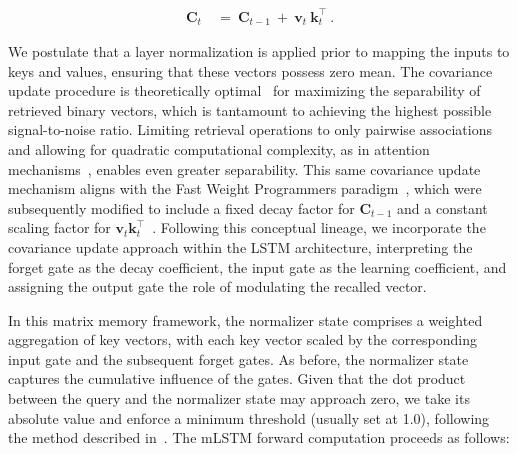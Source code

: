 \begin{align}
\mathbf{C}_t \ &= \ \mathbf{C}_{t-1} \ + \ \mathbf{v}_{t} \ \mathbf{k}_t^\top \ .
\end{align}

We postulate that a layer normalization is applied prior to mapping the inputs to keys and values, ensuring that these vectors possess zero mean. The covariance update procedure is theoretically optimal~\citep{Dayan:91} for maximizing the separability of retrieved binary vectors, which is tantamount to achieving the highest possible signal-to-noise ratio. Limiting retrieval operations to only pairwise associations and allowing for quadratic computational complexity, as in attention mechanisms~\citep{Krotov:16,Krotov:17,Ramsauer:21}, enables even greater separability. This same covariance update mechanism aligns with the Fast Weight Programmers paradigm~\citep{Schmidhuber:92ncfastweights,Schlag:21}, which were subsequently modified to include a fixed decay factor for $\mathbf{C}_{t-1}$ and a constant scaling factor for 
$\mathbf{v}_{t} \mathbf{k}_t ^\top$~\citep{Ba:16}.
Following this conceptual lineage, we incorporate the covariance update approach within the LSTM architecture, interpreting the forget gate as the decay coefficient, the input gate as the learning coefficient, and assigning the output gate the role of modulating the recalled vector.

In this matrix memory framework, the normalizer state comprises a weighted aggregation of key vectors, with each key vector scaled by the corresponding input gate and the subsequent forget gates. As before, the normalizer state captures the cumulative influence of the gates. Given that the dot product between the query and the normalizer state may approach zero, we take its absolute value and enforce a minimum threshold (usually set at 1.0), following the method described in~\citep{Sun:23arxiv}. The mLSTM forward computation proceeds as follows:

